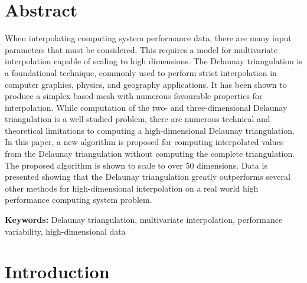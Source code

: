 \documentclass{scspaperproc}
\theoremstyle{scsthe}
\begin{document}
\maketitle

\section*{Abstract}

When interpolating computing system performance data, there are many input
parameters that must be considered. 
This requires a model for multivariate interpolation capable of scaling to 
high dimensions.
The Delaunay triangulation is a foundational technique, commonly used to
perform strict interpolation in computer graphics, physics, and geography 
applications.
It has been shown to produce a simplex based mesh with numerous favourable 
properties for interpolation.
While computation of the two- and three-dimensional Delaunay triangulation is 
a well-studied problem, there are numerous technical and theoretical 
limitations to computing a high-dimensional Delaunay triangulation.
In this paper, a new algorithm is proposed for computing interpolated values
from the Delaunay triangulation without computing the complete triangulation.
The proposed algorithm is shown to scale to over 50 dimensions.
Data is presented showing that the Delaunay triangulation greatly outperforms 
several other methods for high-dimensional interpolation on a real world high 
performance computing system problem.

\textbf{Keywords:} Delaunay triangulation, multivariate interpolation,
performance variability, high-dimensional data

\section{Introduction}
\end{document}
